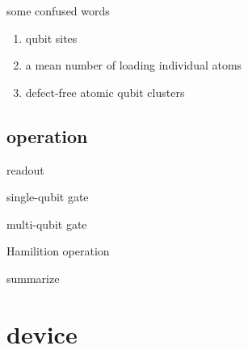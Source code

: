 \documentclass[18 pt]{beamer}
\begin{document}
\begin{frame}{some confused words}
  \begin{enumerate}
    \item qubit sites
    \item a mean number of loading individual atoms
    \item defect-free atomic qubit clusters
  \end{enumerate}
\end{frame}

\subsection{operation}
\begin{frame}{readout}
\end{frame}
\begin{frame}{single-qubit gate}
  
\end{frame}
\begin{frame}{multi-qubit gate}
\end{frame}
\begin{frame}{Hamilition operation}
\end{frame}
\begin{frame}{summarize}
\end{frame}
\section{device}
\end{document}
